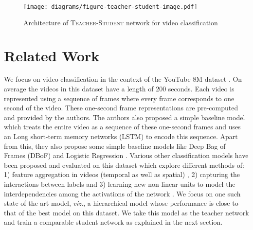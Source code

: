 \documentclass[10pt,twocolumn,letterpaper]{article}
\begin{document}
\begin{figure*}[t]
\centering
\texttt{[image: diagrams/figure-teacher-student-image.pdf]}
\caption{\label{diagram} Architecture of \textsc{Teacher-Student} network for video classification}
\end{figure*}

\section{Related Work}
We focus on video classification in the context of the YouTube-8M dataset \cite{Youtube8M}. On average the videos in this dataset have a length of $200$ seconds. Each video is represented using a sequence of frames where every frame corresponds to one second of the video. These one-second frame representations are pre-computed and provided by the authors. The authors also proposed a simple baseline model which treats the entire video as a sequence of these one-second frames and uses an Long short-term memory networks (LSTM) to encode this sequence. Apart from this, they also propose some simple baseline models like Deep Bag of Frames (DBoF) and Logistic Regression \cite{Youtube8M}.
Various other classification models \cite{willow, monkey-typing, temporal-models-yt8m,aggregate-frame-features, deep-models-videos} have been proposed and evaluated on this dataset which explore different methods of: 1) feature aggregation in videos
(temporal as well as spatial) \cite{aggregate-frame-features,willow}, 2) capturing the interactions between labels \cite{monkey-typing} and 3) learning new non-linear units to model the interdependencies among the activations of the network \cite{willow}. 
We focus on one such state of the art model, \textit{viz.}, a hierarchical model whose performance is close to that of %
the best model on this dataset. We take this model as the teacher network and train a comparable student network as explained in the next section.\\
\end{document}
